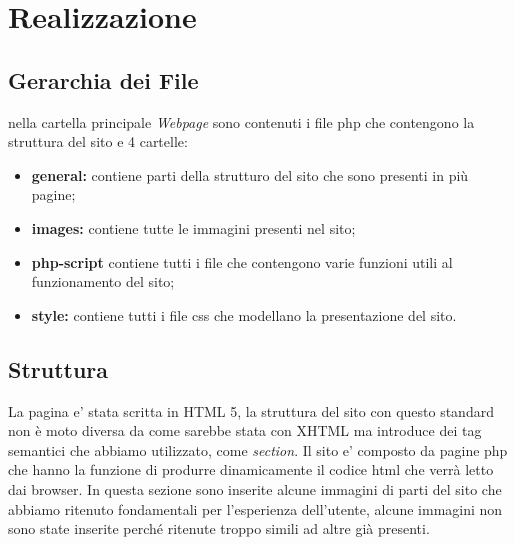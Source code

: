 \section{Realizzazione}
\subsection{Gerarchia dei File}
nella cartella principale \textit{Webpage} sono contenuti i file php che contengono la struttura del sito e 4 cartelle:
\begin{itemize}
	\item \textbf{general:} contiene parti della strutturo del sito che sono presenti in più pagine;
	\item \textbf{images:} contiene tutte le immagini presenti nel sito;
	\item \textbf{php-script} contiene tutti i file che contengono varie funzioni utili al funzionamento del sito;
	\item \textbf{style:} contiene tutti i file css che modellano la presentazione del sito.
\end{itemize}
\subsection{Struttura}
La pagina e' stata scritta in HTML 5, la struttura del sito con questo standard non è moto diversa da come sarebbe stata con XHTML ma introduce dei tag semantici che abbiamo utilizzato, come \emph{section}.\newline
Il sito e' composto da pagine php che hanno la funzione di produrre dinamicamente il codice html che verrà letto dai browser.\newline
In questa sezione sono inserite alcune immagini di parti del sito che abbiamo ritenuto fondamentali per l'esperienza dell'utente, alcune immagini non sono state inserite perché ritenute troppo simili ad altre già presenti. 


